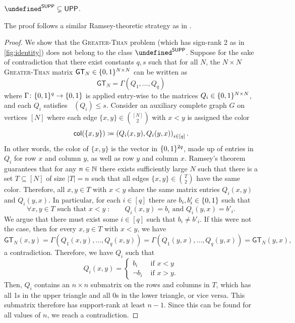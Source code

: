 \documentclass{article}
\DeclareMathOperator{\suprank}{rank_0}
\newcommand{\cplxclass}[1]{\mathsf{#1}}
\let\P\undefined\DeclareMathOperator{\P}{\cplxclass{P}}
\DeclareMathOperator{\UPP}{\cplxclass{UPP}}
\DeclareMathOperator{\SUPP}{\cplxclass{SUPP}}
\newcommand{\GEQ}{\mathsf{GT}}
\begin{document}
\begin{boxproposition}\label{prop:psup-nin-upp}
    $\P^{\SUPP} \subsetneq \UPP$.
\end{boxproposition}
The proof follows a similar Ramsey-theoretic strategy as in \cite{FHHH24}.
\begin{proof}
We show that the \textsc{Greater-Than} problem (which has sign-rank 2 as in
\cref{fig:identity}) does not belong to the class $\P^{\SUPP}$. Suppose for the sake of contradiction
that there exist constants $q, s$ such that for all $N$, the $N \times N$ \textsc{Greater-Than}
matrix $\GEQ_N \in \zo^{N \times N}$ can be written as
\[
    \GEQ_N = \Gamma( Q_1, \dotsc, Q_q )
\]
where $\Gamma \colon \{0,1\}^q \to \{0,1\}$ is applied entry-wise to the matrices $Q_i
\in \{0,1\}^{N \times N}$, and each $Q_i$ satisfies $\suprank(Q_i) \leq s$. Consider an
auxiliary complete graph $G$ on vertices $[N]$ where each edge $\{x,y\} \in
\binom{[N]}{2}$ with $x < y$ is assigned the color
\[
    \mathsf{col}(\{x,y\}) \coloneqq \left( Q_i(x,y), Q_i(y,x) \right)_{i \in [q]} .
\]
In other words, the color of $\{x,y\}$ is the vector in $\{0,1\}^{2q}$, made up of entries in
$Q_i$ for row $x$ and column $y$, as well as row $y$ and column $x$. Ramsey's
theorem guarantees that for any $n \in \mathbb{N}$ there exists sufficiently large $N$
such that there is a set $T \subseteq [N]$ of size $|T| = n$ such that all edges
$\{x,y\} \in \binom{T}{2}$ have the same color. Therefore, all $x,y \in T$ with
$x < y$ share the same matrix entries $Q_i(x,y)$ and $Q_i(y,x)$. In particular,
for each $i \in [q]$ there are $b_i, b'_i \in \{0,1\}$ such that
\[
    \forall x,y \in T \text{ such that } x < y \;\colon\qquad
    Q_i(x,y) = b_i \text{ and } Q_i(y,x) = b'_i .
\]
We argue that there must exist some $i \in [q]$ such that $b_i \neq b'_i$. If this were
not the case, then for every $x,y \in T$ with $x < y$, we have
\[
    \GEQ_N(x,y) = \Gamma(Q_1(x,y), \dotsc, Q_q(x,y))
    = \Gamma(Q_1(y,x), \dotsc, Q_q(y,x)) = \GEQ_N(y,x) ,
\]
a contradiction. Therefore, we have $Q_i$ such that
\[
Q_i(x,y) = \begin{cases}
    b_i &\text{ if } x < y \\
    \neg b_i &\text{ if } x > y .
\end{cases}
\]
Then, $Q_i$ contains an $n \times n$ submatrix on the rows and columns in $T$,
which has all 1s in the upper triangle and all 0s in
the lower triangle, or vice versa. This submatrix therefore has support-rank at least $n-1$.
Since this can be found for all values of $n$, we reach a contradiction.
\end{proof}
\end{document}
